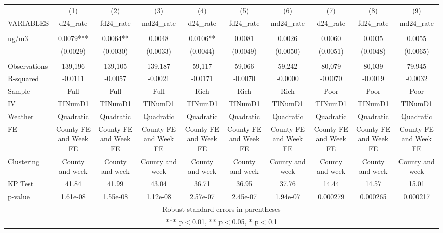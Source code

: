 \begin{tabular}{lccccccccc} \hline
 & (1) & (2) & (3) & (4) & (5) & (6) & (7) & (8) & (9) \\
VARIABLES & d24\_rate & fd24\_rate & md24\_rate & d24\_rate & fd24\_rate & md24\_rate & d24\_rate & fd24\_rate & md24\_rate \\ \hline
 &  &  &  &  &  &  &  &  &  \\
ug/m3 & 0.0079*** & 0.0064** & 0.0048 & 0.0106** & 0.0081 & 0.0026 & 0.0060 & 0.0035 & 0.0055 \\
 & (0.0029) & (0.0030) & (0.0033) & (0.0044) & (0.0049) & (0.0050) & (0.0051) & (0.0048) & (0.0065) \\
 &  &  &  &  &  &  &  &  &  \\
Observations & 139,196 & 139,105 & 139,187 & 59,117 & 59,066 & 59,242 & 80,079 & 80,039 & 79,945 \\
R-squared & -0.0111 & -0.0057 & -0.0021 & -0.0171 & -0.0070 & -0.0000 & -0.0070 & -0.0019 & -0.0032 \\
Sample & Full & Full & Full & Rich & Rich & Rich & Poor & Poor & Poor \\
IV & TINumD1 & TINumD1 & TINumD1 & TINumD1 & TINumD1 & TINumD1 & TINumD1 & TINumD1 & TINumD1 \\
Weather & Quadratic & Quadratic & Quadratic & Quadratic & Quadratic & Quadratic & Quadratic & Quadratic & Quadratic \\
FE & County FE and Week FE & County FE and Week FE & County FE and Week FE & County FE and Week FE & County FE and Week FE & County FE and Week FE & County FE and Week FE & County FE and Week FE & County FE and Week FE \\
Clustering & County and week & County and week & County and week & County and week & County and week & County and week & County and week & County and week & County and week \\
KP Test & 41.84 & 41.99 & 43.04 & 36.71 & 36.95 & 37.76 & 14.44 & 14.57 & 15.01 \\
 p-value & 1.61e-08 & 1.55e-08 & 1.12e-08 & 2.57e-07 & 2.45e-07 & 1.94e-07 & 0.000279 & 0.000265 & 0.000217 \\ \hline
\multicolumn{10}{c}{ Robust standard errors in parentheses} \\
\multicolumn{10}{c}{ *** p$<$0.01, ** p$<$0.05, * p$<$0.1} \\
\end{tabular}
